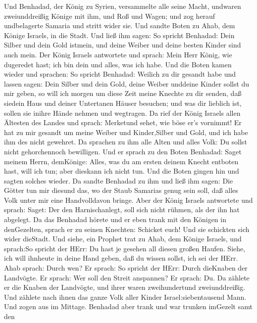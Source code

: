  Und Benhadad, der König zu Syrien, versammelte alle seine
Macht, undwaren zweiunddreißig Könige mit ihm, und Roß und Wagen; und
zog herauf undbelagerte Samaria und stritt wider sie.  Und
sandte Boten zu Ahab, dem Könige Israels, in die Stadt.  Und
ließ ihm sagen: So spricht Benhadad: Dein Silber und dein Gold istmein,
und deine Weiber und deine besten Kinder sind auch mein. 
Der König Israels antwortete und sprach: Mein Herr König, wie dugeredet
hast; ich bin dein und alles, was ich habe.  Und die Boten
kamen wieder und sprachen: So spricht Benhadad: Weilich zu dir gesandt
habe und lassen sagen: Dein Silber und dein Gold, deine Weiber unddeine
Kinder sollst du mir geben,  so will ich morgen um diese
Zeit meine Knechte zu dir senden, daß siedein Haus und deiner Untertanen
Häuser besuchen; und was dir lieblich ist, sollen sie inihre Hände
nehmen und wegtragen.  Da rief der König Israels allen
Ältesten des Landes und sprach: Merketund sehet, wie böse er's vornimmt!
Er hat zu mir gesandt um meine Weiber und Kinder,Silber und Gold, und
ich habe ihm des nicht gewehret.  Da sprachen zu ihm alle
Alten und alles Volk: Du sollst nicht gehorchennoch bewilligen.
 Und er sprach zu den Boten Benhadad: Saget meinem Herrn,
demKönige: Alles, was du am ersten deinem Knecht entboten hast, will ich
tun; aber dieskann ich nicht tun. Und die Boten gingen hin und sagten
solches wieder.  Da sandte Benhadad zu ihm und ließ ihm
sagen: Die Götter tun mir diesund das, wo der Staub Samarias genug sein
soll, daß alles Volk unter mir eine Handvolldavon bringe. 
Aber der König Israels antwortete und sprach: Saget: Der den
Harnischanlegt, soll sich nicht rühmen, als der ihn hat abgelegt.
 Da das Benhadad hörete und er eben trank mit den Königen
in denGezelten, sprach er zu seinen Knechten: Schicket euch! Und sie
schickten sich wider dieStadt.  Und siehe, ein Prophet trat
zu Ahab, dem Könige Israels, und sprach:So spricht der HErr: Du hast je
gesehen all diesen großen Haufen. Siehe, ich will ihnheute in deine Hand
geben, daß du wissen sollst, ich sei der HErr.  Ahab
sprach: Durch wen? Er sprach: So spricht der HErr: Durch dieKnaben der
Landvögte. Er sprach: Wer soll den Streit anspannen? Er sprach: Du.
 Da zählete er die Knaben der Landvögte, und ihrer waren
zweihundertund zweiunddreißig. Und zählete nach ihnen das ganze Volk
aller Kinder Israel:siebentausend Mann.  Und zogen aus im
Mittage. Benhadad aber trank und war trunken imGezelt samt den
